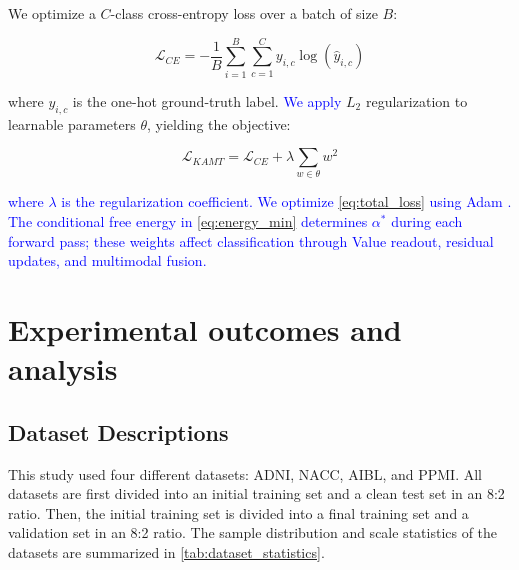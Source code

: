 \documentclass[lettersize,journal]{IEEEtran}
\begin{document}
    We optimize a $C$-class cross-entropy loss over a batch of size $B$:
    
    \begin{equation}
        \mathcal{L}_{CE} = - \frac{1}{B} \sum_{i=1}^{B} \sum_{c=1}^{C} y_{i,c} \log(\hat{y}_{i,c})
        \label{eq:cross_entropy}
    \end{equation}

    where $y_{i,c}$ is the one-hot ground-truth label. \textcolor{blue}{We apply} $L_2$ regularization to learnable parameters $\theta$, yielding the objective:
    
    \begin{equation}
        \mathcal{L}_{KAMT} = \mathcal{L}_{CE} + \lambda \sum_{w \in \theta} w^2
        \label{eq:total_loss}
    \end{equation}

    \textcolor{blue}{where $\lambda$ is the regularization coefficient. We optimize \cref{eq:total_loss} using Adam \cite{kingma2014adam}. The conditional free energy in \cref{eq:energy_min} determines $\alpha^*$ during each forward pass; these weights affect classification through Value readout, residual updates, and multimodal fusion.}

\section{Experimental outcomes and analysis}

\subsection{Dataset Descriptions}

    This study used four different datasets: ADNI\cite{weiner2013adni}, NACC\cite{beekly2007nacc}, AIBL\cite{ellis2009aibl}, and PPMI\cite{marek2011ppmi}. All datasets are first divided into an initial training set and a clean test set in an 8:2 ratio. Then, the initial training set is divided into a final training set and a validation set in an 8:2 ratio. The sample distribution and scale statistics of the datasets are summarized in \cref{tab:dataset_statistics}.
\end{document}
